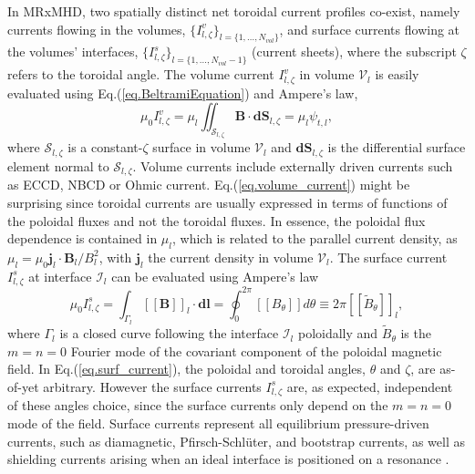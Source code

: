 \documentclass[my_thesis.tex]{subfiles}
\begin{document}
In \ac{MRxMHD}, two spatially distinct net toroidal current profiles co-exist, namely currents flowing in the volumes, $\{I^v_{l,\zeta}\}_{l=\{1,\ldots,N_{vol}\}}$, and surface currents flowing at the volumes' interfaces, $\{I^s_{l,\zeta}\}_{l=\{1,\ldots,N_{vol}-1\}}$ (current sheets), where the subscript $\zeta$ refers to the toroidal angle. The volume current $I^v_{l,\zeta}$ in volume $\mathcal{V}_l$ is easily evaluated using Eq.(\ref{eq.BeltramiEquation}) and Ampere's law,
\begin{equation}
    \mu_0I^v_{l,\zeta} = \mu_l\iint_{\mathcal{S}_{l,\zeta}} \mathbf{B}\cdot\mathbf{dS}_{l,\zeta} = \mu_l \psi_{t,l},
    \label{eq.volume_current}
\end{equation}
where $\mathcal{S}_{l,\zeta}$ is a constant-$\zeta$ surface in volume $\mathcal{V}_l$ and $\mathbf{dS}_{l,\zeta}$ is the differential surface element normal to $\mathcal{S}_{l,\zeta}$. Volume currents include externally driven currents such as \ac{ECCD}, \ac{NBCD} or Ohmic current. Eq.(\ref{eq.volume_current}) might be surprising since toroidal currents are usually expressed in terms of functions of the poloidal fluxes and not the toroidal fluxes. In essence, the poloidal flux dependence is contained in $\mu_l$, which is related to the parallel current density, as $\mu_l = \mu_0 \mathbf{j}_l\cdot\mathbf{B}_l / B_l^2$, with $\mathbf{j}_l$ the current density in volume $\mathcal{V}_l$. The surface current $I^s_{l,\zeta}$ at interface $\mathcal{I}_l$ can be evaluated using Ampere's law
\begin{equation}
    \mu_0I^s_{l,\zeta} = \int_{\Gamma _l} \left[\left[ \mathbf{B} \right]\right]_l \cdot \mathbf{dl} = \oint_0^{2\pi} \left[\left[B_\theta\right]\right] d\theta \equiv 2\pi \left[\left[ \tilde{B}_{\theta} \right]\right]_l, \label{eq.surf_current}
\end{equation}
where $\Gamma_l$ is a closed curve following the interface $\mathcal{I}_l$ poloidally and $\tilde{B}_{\theta}$ is the $m=n=0$ Fourier mode of the covariant component of the poloidal magnetic field. In Eq.(\ref{eq.surf_current}), the poloidal and toroidal angles, $\theta$ and $\zeta$, are as-of-yet arbitrary. However the surface currents $I^s_{l,\zeta}$ are, as expected, independent of these angles choice, since the surface currents only depend on the $m=n=0$ mode of the field. Surface currents represent all equilibrium pressure-driven currents, such as diamagnetic, Pfirsch-Schl\"uter, and bootstrap currents, as well as shielding currents arising when an ideal interface is positioned on a resonance \citep{Loizu2015}.
\end{document}
